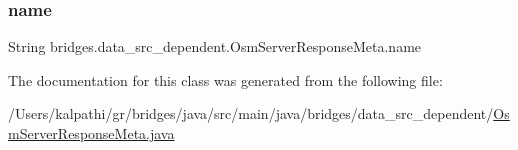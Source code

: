\subsubsection{\texorpdfstring{name}{name}}
{\footnotesize\ttfamily String bridges.\+data\+\_\+src\+\_\+dependent.\+Osm\+Server\+Response\+Meta.\+name}



The documentation for this class was generated from the following file\+:\begin{DoxyCompactItemize}
\item 
/\+Users/kalpathi/gr/bridges/java/src/main/java/bridges/data\+\_\+src\+\_\+dependent/\mbox{\hyperlink{_osm_server_response_meta_8java}{Osm\+Server\+Response\+Meta.\+java}}\end{DoxyCompactItemize}
